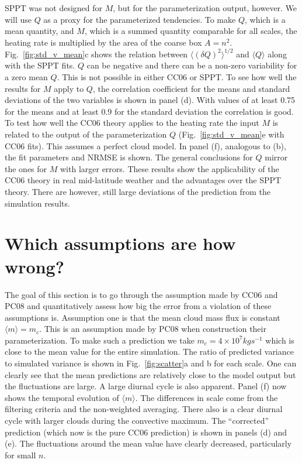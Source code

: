 \documentclass[a4paper, 12pt]{article}
\begin{document}
SPPT was not designed for $M$, but for the parameterization output, however. We will use $Q$ as a proxy for the parameterized tendencies. To make $Q$, which is a mean quantity, and $M$, which is a summed quantity comparable for all scales, the heating rate is multiplied by the area of the coarse box $A = n^2$. Fig.~\ref{fig:std_v_mean}c shows the relation between $\langle (\delta Q)^2 \rangle^{1/2}$ and $\langle Q \rangle$ along with the SPPT fits. $Q$ can be negative and there can be a non-zero variability for a zero mean $Q$. This is not possible in either CC06 or SPPT. To see how well the results for $M$ apply to $Q$, the correlation coefficient for the means and standard deviations of the two variables is shown in panel (d). With values of at least 0.75 for the means and at least 0.9 for the standard deviation the correlation is good. To test how well the CC06 theory applies to the heating rate the input $M$ is related to the output of the parameterization $Q$ (Fig.~\ref{fig:std_v_mean}e with CC06 fits). This assumes a perfect cloud model. In panel (f), analogous to (b), the fit parameters and NRMSE is shown. The general conclusions for $Q$ mirror the ones for $M$ with larger errors. These results show the applicability of the CC06 theory in real mid-latitude weather and the advantages over the SPPT theory. There are however, still large deviations of the prediction from the simulation results.

\section{Which assumptions are how wrong?}
The goal of this section is to go through the assumption made by CC06 and PC08 and quantitatively assess how big the error from a violation of these assumptions is. Assumption one is that the mean cloud mass flux is constant $\langle m \rangle = m_c$. This is an assumption made by PC08 when construction their parameterization. To make such a prediction we take $m_c = 4 \times 10^7 kg s^{-1}$ which is close to the mean value for the entire simulation. The ratio of predicted variance to simulated variance is shown in Fig.~\ref{fig:scatter}a and b for each scale. One can clearly see that the mean predictions are relatively close to the model output but the fluctuations are large. A large diurnal cycle is also apparent. Panel (f) now shows the temporal evolution of $\langle m \rangle$. The differences in scale come from the filtering criteria and the non-weighted averaging. There also is a clear diurnal cycle with larger clouds during the convective maximum. The ``corrected'' prediction (which now is the pure CC06 prediction) is shown in panels (d) and (e). The fluctuations around the mean value have clearly decreased, particularly for small $n$. 
\end{document}
